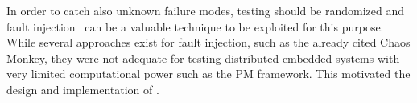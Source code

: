 In order to catch also unknown failure modes, %
testing should be randomized and fault injection~\cite{nondeterministic} can be a valuable technique to be exploited for this purpose. 
While several approaches exist for fault injection, such as the already cited Chaos Monkey, they were not adequate for testing distributed embedded systems with very limited computational power such as the PM framework. This motivated the design and implementation of \approach{}. 


